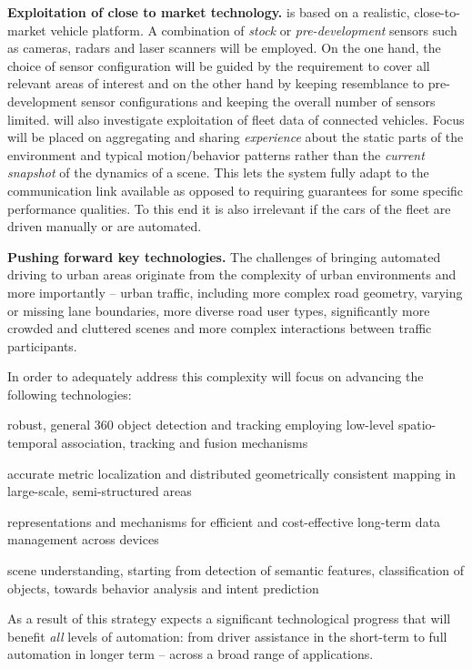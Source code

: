 \textbf{Exploitation of close to market technology.}
\Project{} is based on a realistic, close-to-market vehicle platform. A combination of \emph{stock} or \emph{pre-development} sensors such as cameras, radars and laser scanners will be employed. On the one hand, the choice of sensor configuration will be guided by the requirement to cover all relevant areas of interest and on the other hand by keeping resemblance to pre-development sensor configurations and keeping the overall number of sensors limited. \Project will also investigate exploitation of fleet data of connected vehicles. Focus will be placed on aggregating and sharing \emph{experience} about the static parts of the environment and typical motion/behavior patterns rather than the \emph{current snapshot} of the dynamics of a scene. This lets the system fully adapt to the communication link available as opposed to requiring guarantees for some specific performance qualities. To this end it is also irrelevant if the cars of the fleet are driven manually or are automated.


\textbf{Pushing forward key technologies.}
The challenges of bringing automated driving to urban areas originate from the complexity of urban environments and more importantly -- urban traffic, including more complex road geometry, varying or missing lane boundaries, more diverse road user types, significantly more crowded and cluttered scenes and more complex interactions between traffic participants.

In order to adequately address this complexity \Project will focus on advancing the following technologies:
\begin{denseItemize}
	\item robust, general 360\degree{} object detection and tracking employing low-level spatio-temporal association, tracking and fusion mechanisms 
	\item accurate metric localization and distributed geometrically consistent mapping in large-scale, semi-structured areas
	\item representations and mechanisms for efficient and cost-effective long-term data management across devices
	\item scene understanding, starting from detection of semantic features, classification of objects, towards behavior analysis and intent prediction
\end{denseItemize}

As a result of this strategy \Project expects a significant technological progress that will benefit \emph{all} levels of automation: from driver assistance in the short-term to full automation in longer term -- across a broad range of applications.


